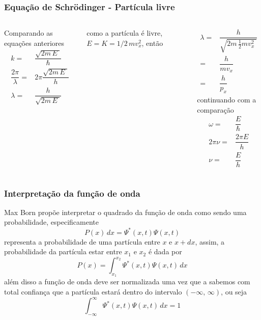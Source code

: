 \documentclass[12pt,brazil,table]{beamer}
\begin{document}
\begin{frame}
  \frametitle{Equação de Schrödinger - Partícula livre}
  \fontsize{9pt}{11pt}\selectfont
    
    \begin{columns}[c]

      \column{5cm}
    Comparando as equações anteriores
      \[
        \begin{align*}
            k =& \dfrac{\sqrt{2m\,E\;}}{\hbar}\\
            \dfrac{2\pi}{\lambda}=& 2\pi\dfrac{\sqrt{2m\,E\;}}{h}\\
            \lambda =& \dfrac{h}{\sqrt{2m\,E\;}}
          \end{align*}
      \]

      como a partícula é livre, $E=K=1/2\, mv_x^2$, então
      \column{5cm}
      
      \[
        \begin{align*}
            \lambda =& \dfrac{h}{\sqrt{2m\,\frac{1}{2} mv_x^2\;}}\\
            =& \dfrac{h}{mv_x}\\
            =&\dfrac{h}{p_x}
        \end{align*}
      \]
      continuando com a comparação
      \[
       \begin{align*}
            \omega =& \dfrac{E}{\hbar}\\
            2\pi \nu =& \dfrac{2\pi E}{h}\\
            \nu =&  \dfrac{E}{h}
        \end{align*}
      \]
      
    \end{columns}
  
\end{frame}



\begin{frame}
  \frametitle{Interpretação da função de onda}
  \fontsize{9pt}{11pt}\selectfont
  
  Max Born propõe interpretar o quadrado da função de onda como sendo uma probabilidade, especificamente
  \[
   P(x)\, dx = \Psi ^* (x,t) \Psi (x,t)
  \]
  representa a probabilidade de uma partícula entre $x$ e $x+dx$, assim, a probabilidade da partícula estar entre $x_1$ e $x_2$ é dada por
  \[
   P(x) = \int_{x_1}^{x_2}\Psi ^* (x,t) \Psi (x,t)\, dx
  \]
  além disso a função de onda deve ser normalizada uma vez que a sabemos com total confiança que a partícula estará dentro do intervalo $\left( -\infty,\, \infty \right)$, ou seja
  \[
   \int_{-\infty}^{\infty}\Psi ^* (x,t) \Psi (x,t)\, dx = 1
  \]

\end{frame}
  
\end{document}
